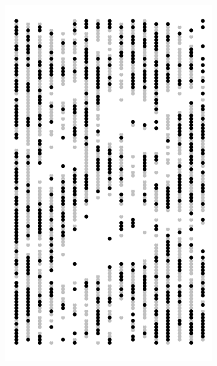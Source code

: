 \documentclass{uwstat572}
\begin{document}
\begin{figure}[!b]
	\centering
	\begin{subfigure}[b]{0.24\textwidth}
		\includegraphics[width=\textwidth]{figures/figure_5a.png}
		\caption{}
		\label{fig:week_35}
	\end{subfigure}
	\hfill
	\begin{subfigure}[b]{0.24\textwidth}

\end{subfigure}
\end{figure}
\end{document}
